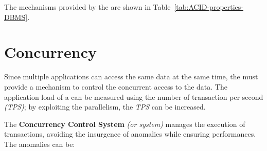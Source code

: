 \documentclass[english]{article}
\begin{document}
The mechanisms provided by the \DBMS are shown in Table~\ref{tab:ACID-properties-DBMS}.

\begin{table}[htbp]
  \bigskip
  \centering
  \bigskip
  \caption{ACID properties and the \DBMS mechanisms}
  \label{tab:ACID-properties-DBMS}
\end{table}

\clearpage

\section{Concurrency}

Since multiple applications can access the same data at the same time, the \DBMS must provide a mechanism to control the concurrent access to the data.
The application load of a \DBMS can be measured using the number of transaction per second \textit{(TPS)};
by exploiting the parallelism, the \textit{TPS} can be increased.

The \textbf{Concurrency Control System} \textit{(or \CC system)} manages the execution of transactions, avoiding the insurgence of anomalies while ensuring performances.
The anomalies can be:
\end{document}
